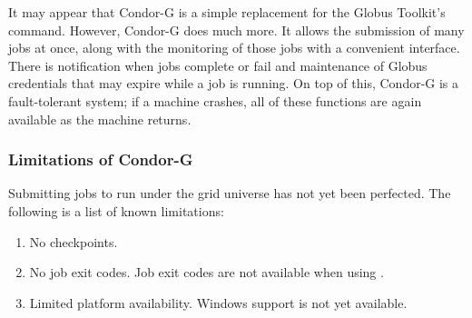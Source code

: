 
It may appear that Condor-G is a simple replacement
for the Globus Toolkit's  command.
However, Condor-G does much more.
It allows the submission of many jobs at once,
along with the monitoring of those jobs with a convenient interface.
There is notification when jobs complete or fail
and maintenance of Globus credentials
that may expire while a job is running.
On top of this, Condor-G is a fault-tolerant system;
if a machine crashes,
all of these functions are again available as the machine returns.










\subsubsection{\label{sec:Condor-G-Limits}Limitations of Condor-G}
Submitting jobs to run under the grid universe has not yet
been perfected.
The following is a list of known limitations:

\begin{enumerate}
\item{No checkpoints.}
\item{No job exit codes.}
Job exit codes are not available when using
.
\item{Limited platform availability.}
Windows support is not yet available.
\end{enumerate}



